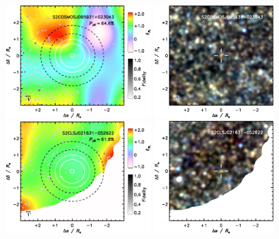 \documentclass[a4paper, fleqn, usenatbib]{mnras}
\begin{document}
\addtocounter{figure}{-1}
\begin{figure}
    \centering
    \includegraphics[width=0.5\textwidth]{S2COSMOSJ095931+023043-overdensity}
    \includegraphics[width=0.41\textwidth]{S2COSMOSJ095931+023043-spire-rgb}\\\vspace{1em}
    \includegraphics[width=0.5\textwidth]{S2CLSJ021631-052622-overdensity}
    \includegraphics[width=0.41\textwidth]{S2CLSJ021631-052622-spire-rgb}\\\vspace{1em}

\end{figure}
\end{document}
